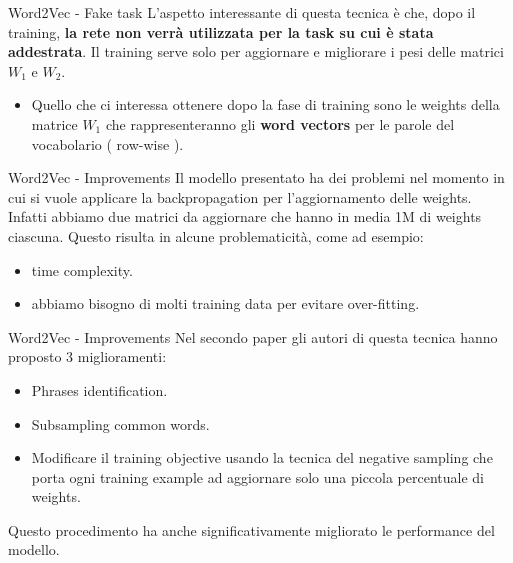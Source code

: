 \documentclass[british]{beamer}
\begin{document}

\begin{frame}{Word2Vec - Fake task}
	L'aspetto interessante di questa tecnica \`{e} che, dopo il training, \textbf{la rete non verr\`{a} utilizzata per la task su cui \`{e} stata addestrata}. Il training serve solo per aggiornare e migliorare i pesi delle matrici \(W_1\) e \(W_2\).
	\begin{itemize}
		\item Quello che ci interessa ottenere dopo la fase di training sono le weights della matrice \(W_1\) che rappresenteranno gli \textbf{word vectors} per le parole del vocabolario ( row-wise ).
	\end{itemize}
\end{frame}

\begin{frame}{Word2Vec - Improvements}
	Il modello presentato ha dei problemi nel momento in cui si vuole applicare la backpropagation per l'aggiornamento delle weights.
	Infatti abbiamo due matrici da aggiornare che hanno in media 1M di weights ciascuna.
	Questo risulta in alcune problematicit\`{a}, come ad esempio:
	\begin{itemize}
		\item time complexity.
		\item abbiamo bisogno di molti training data per evitare over-fitting.
	\end{itemize}
\end{frame}
\begin{frame}{Word2Vec - Improvements}
	Nel secondo paper gli autori di questa tecnica hanno proposto 3 miglioramenti:
	\begin{itemize}
		\item Phrases identification.
		\item Subsampling common words.
		\item Modificare il training objective usando la tecnica del negative sampling che porta ogni training example ad aggiornare solo una piccola percentuale di weights.
	\end{itemize}
	Questo procedimento ha anche significativamente migliorato le performance del modello.
\end{frame}
\end{document}
